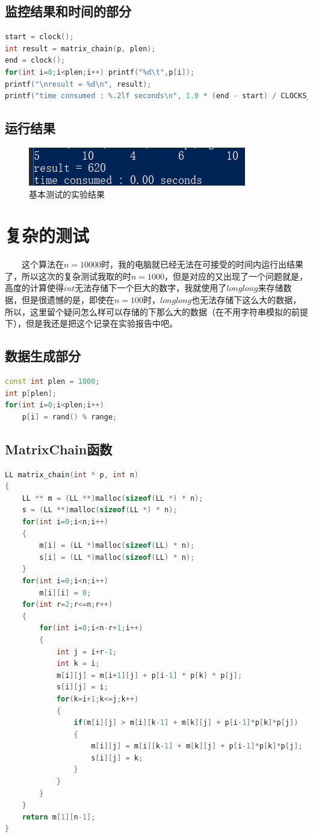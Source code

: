 \documentclass[11pt]{ctexart}
\begin{document}
\subsection{监控结果和时间的部分}
\begin{lstlisting}[language=C++]
start = clock();
int result = matrix_chain(p, plen);
end = clock();
for(int i=0;i<plen;i++) printf("%d\t",p[i]);
printf("\nresult = %d\n", result);
printf("time consumed : %.2lf seconds\n", 1.0 * (end - start) / CLOCKS_PER_SEC);
\end{lstlisting}
\subsection{运行结果}
\begin{figure}[H]
\centering
\includegraphics{3.png}
\caption{基本测试的实验结果}
\end{figure}

\section{复杂的测试}
\noindent　　这个算法在$n=10000$时，我的电脑就已经无法在可接受的时间内运行出结果了，所以这次的复杂测试我取的时$n=1000$，但是对应的又出现了一个问题就是，高度的计算使得$int$无法存储下一个巨大的数字，我就使用了$long long$来存储数据，但是很遗憾的是，即使在$n=100$时，$long long$也无法存储下这么大的数据，所以，这里留个疑问怎么样可以存储的下那么大的数据（在不用字符串模拟的前提下），但是我还是把这个记录在实验报告中吧。
\subsection{数据生成部分}
\begin{lstlisting}[language=C++]
const int plen = 1000;
int p[plen];
for(int i=0;i<plen;i++)
	p[i] = rand() % range;
\end{lstlisting}

\subsection{MatrixChain函数}
\begin{lstlisting}[language=C++]
LL matrix_chain(int * p, int n)
{
	LL ** m = (LL **)malloc(sizeof(LL *) * n);
	s = (LL **)malloc(sizeof(LL *) * n);
	for(int i=0;i<n;i++)
	{
		m[i] = (LL *)malloc(sizeof(LL) * n);
		s[i] = (LL *)malloc(sizeof(LL) * n);
	}
	for(int i=0;i<n;i++)
		m[i][i] = 0;		
	for(int r=2;r<=n;r++)
	{
		for(int i=0;i<n-r+1;i++)
		{
			int j = i+r-1;
			int k = i;
			m[i][j] = m[i+1][j] + p[i-1] * p[k] * p[j];
			s[i][j] = i;
			for(k=i+1;k<=j;k++)
			{
				if(m[i][j] > m[i][k-1] + m[k][j] + p[i-1]*p[k]*p[j])
				{
					m[i][j] = m[i][k-1] + m[k][j] + p[i-1]*p[k]*p[j];
					s[i][j] = k;
				}
			}
		}
	}
	return m[1][n-1];
}
\end{lstlisting}
\end{document}
